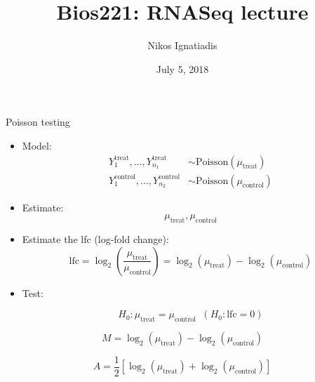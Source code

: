 \documentclass[red,xcolor={table,usenames,dvipsnames}]{beamer}
\title{Bios221: RNASeq lecture}
\author{Nikos Ignatiadis}
\institute{Stanford}
\date{July 5, 2018}
\begin{document}
\begin{frame}
	\titlepage
\end{frame}







\begin{frame}{Poisson testing}



\begin{itemize}
  \item Model:
  \begin{equation*}
\begin{aligned}
Y^{\text{treat}}_{1},\dotsc, Y^{\text{treat}}_{n_1} &\sim \text{Poisson}(\mu_{\text{treat}})\\
Y^{\text{control}}_{1},\dotsc, Y^{\text{control}}_{n_2} &\sim \text{Poisson}(\mu_{\text{control}})
\end{aligned}
\end{equation*}
  \item Estimate: $$\mu_{\text{treat}}, \mu_{\text{control}}$$
  \item Estimate the lfc (log-fold change):
          $$ \text{lfc} = \log_2\left(\frac{\mu_{\text{treat}}}{\mu_{\text{control}}} \right) = \log_2(\mu_{\text{treat}}) - \log_2(\mu_{\text{control}}) $$
  \item Test:

  $$H_0: \mu_{\text{treat}} = \mu_{\text{control}} \;\; (H_0:\text{lfc}=0) $$
\end{itemize}
\end{frame}


\begin{frame}
  $$M = \log_2(\mu_{\text{treat}}) - \log_2(\mu_{\text{control}}) $$

  $$A = \frac{1}{2}\left[\log_2(\mu_{\text{treat}}) + \log_2(\mu_{\text{control}})\right]$$
\end{frame}
\end{document}
